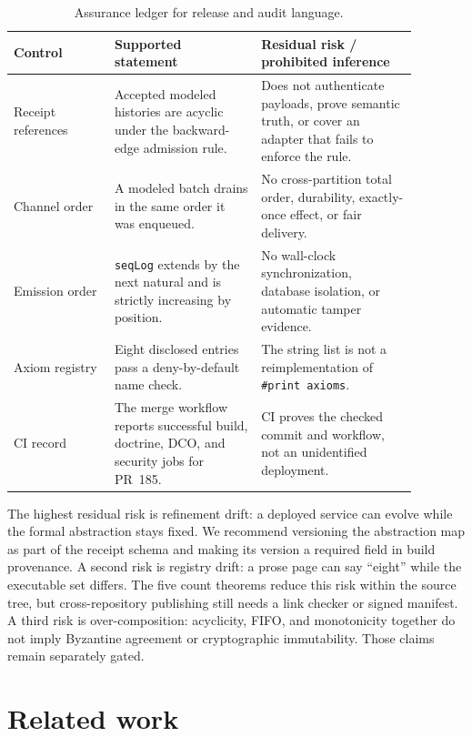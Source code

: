 \documentclass[11pt,letterpaper]{article}
\theoremstyle{definition}
\begin{document}
\begin{table}[h]
\centering
\small
\begin{tabular}{@{}p{0.22\linewidth}p{0.32\linewidth}p{0.34\linewidth}@{}}
\toprule
Control & Supported statement & Residual risk / prohibited inference \\
\midrule
Receipt references & Accepted modeled histories are acyclic under the
backward-edge admission rule. & Does not authenticate payloads, prove semantic
truth, or cover an adapter that fails to enforce the rule. \\
Channel order & A modeled batch drains in the same order it was enqueued. & No
cross-partition total order, durability, exactly-once effect, or fair delivery. \\
Emission order & \texttt{seqLog} extends by the next natural and is strictly
increasing by position. & No wall-clock synchronization, database isolation, or
automatic tamper evidence. \\
Axiom registry & Eight disclosed entries pass a deny-by-default name check. &
The string list is not a reimplementation of \texttt{\#print axioms}. \\
CI record & The merge workflow reports successful build, doctrine, DCO, and
security jobs for PR~185. & CI proves the checked commit and workflow, not an
unidentified deployment. \\
\bottomrule
\end{tabular}
\caption{Assurance ledger for release and audit language.}
\label{tab:ledger}
\end{table}

The highest residual risk is refinement drift: a deployed service can evolve
while the formal abstraction stays fixed. We recommend versioning the
abstraction map as part of the receipt schema and making its version a required
field in build provenance. A second risk is registry drift: a prose page can
say ``eight'' while the executable set differs. The five count theorems reduce
this risk within the source tree, but cross-repository publishing still needs a
link checker or signed manifest. A third risk is over-composition: acyclicity,
FIFO, and monotonicity together do not imply Byzantine agreement or
cryptographic immutability. Those claims remain separately gated.

\section{Related work}\label{sec:related}
\end{document}
